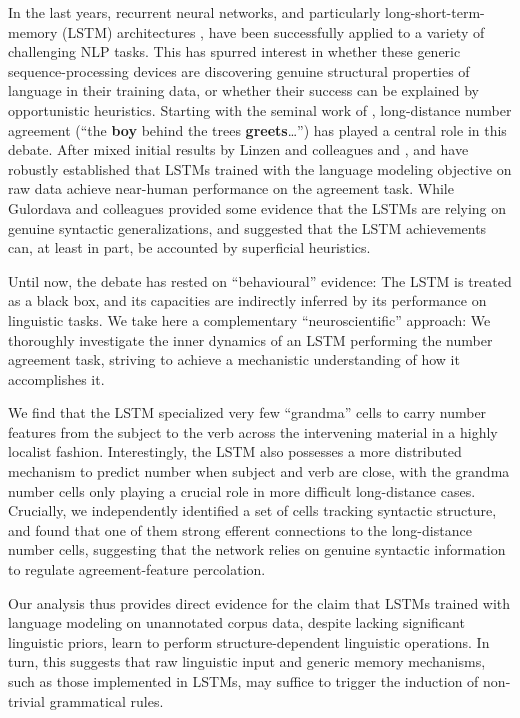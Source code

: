In the last years, recurrent neural networks, and particularly
long-short-term-memory (LSTM) architectures
\cite{Hochreiter:Schmidhuber:1997}, have been successfully applied to
a variety of challenging NLP tasks. This has spurred interest in
whether these generic sequence-processing devices are discovering
genuine structural properties of language in their training data, or
whether their success can be explained by opportunistic
heuristics. Starting with the seminal work of
, long-distance number agreement (``the
\textbf{boy} behind the trees \textbf{greets}\ldots'') has played a
central role in this debate. After mixed initial results by Linzen and
colleagues and ,
 and  have
robustly established that LSTMs trained with the language modeling
objective on raw data achieve near-human performance on the
agreement task. While Gulordava and colleagues provided some evidence that the
LSTMs are relying on genuine syntactic generalizations,
 and 
suggested that the LSTM achievements can, at least in part, be
accounted by superficial heuristics.

Until now, the debate has rested on ``behavioural'' evidence: The
LSTM is treated as a black box, and its capacities are indirectly
inferred by its performance on linguistic tasks. We take here a
complementary ``neuroscientific'' approach: We thoroughly investigate
the inner dynamics of an LSTM performing the number agreement task,
striving to achieve a mechanistic understanding of how it accomplishes
it.

We find that the LSTM specialized very few ``grandma'' cells
\cite{Bowers:2009} to carry number features from the subject to the
verb across the intervening material in a highly localist
fashion. Interestingly, the LSTM also possesses a more distributed
mechanism to predict number when subject and verb are close, with the
grandma number cells only playing a crucial role in more difficult
long-distance cases. Crucially, we independently identified a set of
cells tracking syntactic structure, and found that one of them  strong efferent connections to the long-distance number cells,
suggesting that the network relies on genuine syntactic information to
regulate agreement-feature percolation.

Our analysis thus provides direct evidence for the claim that LSTMs
trained with language modeling on unannotated corpus data, despite
lacking significant linguistic priors, learn to perform
structure-dependent linguistic operations. In turn, this suggests that
raw linguistic input and generic memory mechanisms, such as those
implemented in LSTMs, may suffice to trigger the induction of
non-trivial grammatical rules.
